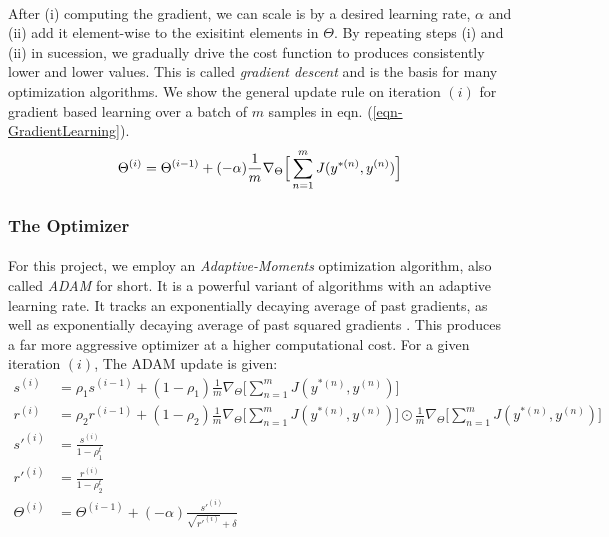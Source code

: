 \documentclass[12pt,letterpaper]{article}
\begin{document}
\paragraph*{}After (i) computing the gradient, we can scale is by a desired learning rate, $\alpha$ and (ii) add it element-wise to the exisitint elements in $\Theta$. By repeating steps (i) and (ii) in sucession, we gradually drive the cost function to produces consistently lower and lower values. This is called \textit{gradient descent} and is the basis for many optimization algorithms. We show the general update rule on iteration $(i)$ for gradient based learning over a batch of $m$ samples in eqn. (\ref{eqn-GradientLearning}).
\begin{equation}
\label{eqn-GradientLearning}
\Theta^{(i)} = \Theta^{(i-1)} + (-\alpha)\frac{1}{m} \nabla_{\Theta} \Big[\sum_{n=1}^{m} J(y^{*(n)},y^{(n)}) \Big] \\
\end{equation}


\subsubsection{The Optimizer}

\paragraph*{}For this project, we employ an \textit{Adaptive-Moments} optimization algorithm, also called \textit{ADAM} for short. It is a powerful variant of algorithms with an adaptive learning rate. It tracks an exponentially decaying average of past gradients, as well as exponentially decaying average of past squared gradients \cite{Geron}. This produces a far more aggressive optimizer at a higher computational cost. For a given iteration $(i)$, The ADAM update is given:
\begin{equation}
\label{eqn-ADAMupdate}
\begin{split}
s^{(i)} &= \rho_1 s^{(i-1)} + (1 - \rho_1) \frac{1}{m} \nabla_{\Theta} \Big[\sum_{n=1}^{m} J(y^{*(n)},y^{(n)}) \Big]  \\
r^{(i)} &= \rho_2 r^{(i-1)} + (1 - \rho_2) \frac{1}{m} \nabla_{\Theta} \Big[\sum_{n=1}^{m} J(y^{*(n)},y^{(n)}) \Big] \odot
							\frac{1}{m} \nabla_{\Theta} \Big[\sum_{n=1}^{m} J(y^{*(n)},y^{(n)}) \Big]  \\
s'^{(i)} &= \frac{s^{(i)}}{1-\rho_1^t} \\
r'^{(i)} &= \frac{r^{(i)}}{1-\rho_2^t} \\
\Theta^{(i)} &= \Theta^{(i-1)} + (-\alpha)\frac{s'^{(i)}}{\sqrt{r'^{(i)}}+\delta} \\
\end{split}
\end{equation}
\end{document}

